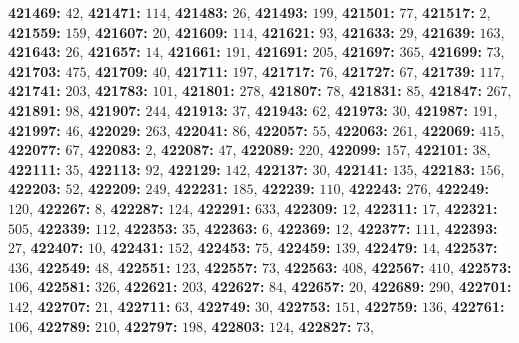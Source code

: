 \textsf{\bfseries 421469:} $42$, \textsf{\bfseries 421471:} $114$, \textsf{\bfseries 421483:} $26$, \textsf{\bfseries 421493:} $199$, \textsf{\bfseries 421501:} $77$, \textsf{\bfseries 421517:} $2$, \textsf{\bfseries 421559:} $159$, \textsf{\bfseries 421607:} $20$, \textsf{\bfseries 421609:} $114$, \textsf{\bfseries 421621:} $93$, \textsf{\bfseries 421633:} $29$, \textsf{\bfseries 421639:} $163$, \textsf{\bfseries 421643:} $26$, \textsf{\bfseries 421657:} $14$, \textsf{\bfseries 421661:} $191$, \textsf{\bfseries 421691:} $205$, \textsf{\bfseries 421697:} $365$, \textsf{\bfseries 421699:} $73$, \textsf{\bfseries 421703:} $475$, \textsf{\bfseries 421709:} $40$, \textsf{\bfseries 421711:} $197$, \textsf{\bfseries 421717:} $76$, \textsf{\bfseries 421727:} $67$, \textsf{\bfseries 421739:} $117$, \textsf{\bfseries 421741:} $203$, \textsf{\bfseries 421783:} $101$, \textsf{\bfseries 421801:} $278$, \textsf{\bfseries 421807:} $78$, \textsf{\bfseries 421831:} $85$, \textsf{\bfseries 421847:} $267$, \textsf{\bfseries 421891:} $98$, \textsf{\bfseries 421907:} $244$, \textsf{\bfseries 421913:} $37$, \textsf{\bfseries 421943:} $62$, \textsf{\bfseries 421973:} $30$, \textsf{\bfseries 421987:} $191$, \textsf{\bfseries 421997:} $46$, \textsf{\bfseries 422029:} $263$, \textsf{\bfseries 422041:} $86$, \textsf{\bfseries 422057:} $55$, \textsf{\bfseries 422063:} $261$, \textsf{\bfseries 422069:} $415$, \textsf{\bfseries 422077:} $67$, \textsf{\bfseries 422083:} $2$, \textsf{\bfseries 422087:} $47$, \textsf{\bfseries 422089:} $220$, \textsf{\bfseries 422099:} $157$, \textsf{\bfseries 422101:} $38$, \textsf{\bfseries 422111:} $35$, \textsf{\bfseries 422113:} $92$, \textsf{\bfseries 422129:} $142$, \textsf{\bfseries 422137:} $30$, \textsf{\bfseries 422141:} $135$, \textsf{\bfseries 422183:} $156$, \textsf{\bfseries 422203:} $52$, \textsf{\bfseries 422209:} $249$, \textsf{\bfseries 422231:} $185$, \textsf{\bfseries 422239:} $110$, \textsf{\bfseries 422243:} $276$, \textsf{\bfseries 422249:} $120$, \textsf{\bfseries 422267:} $8$, \textsf{\bfseries 422287:} $124$, \textsf{\bfseries 422291:} $633$, \textsf{\bfseries 422309:} $12$, \textsf{\bfseries 422311:} $17$, \textsf{\bfseries 422321:} $505$, \textsf{\bfseries 422339:} $112$, \textsf{\bfseries 422353:} $35$, \textsf{\bfseries 422363:} $6$, \textsf{\bfseries 422369:} $12$, \textsf{\bfseries 422377:} $111$, \textsf{\bfseries 422393:} $27$, \textsf{\bfseries 422407:} $10$, \textsf{\bfseries 422431:} $152$, \textsf{\bfseries 422453:} $75$, \textsf{\bfseries 422459:} $139$, \textsf{\bfseries 422479:} $14$, \textsf{\bfseries 422537:} $436$, \textsf{\bfseries 422549:} $48$, \textsf{\bfseries 422551:} $123$, \textsf{\bfseries 422557:} $73$, \textsf{\bfseries 422563:} $408$, \textsf{\bfseries 422567:} $410$, \textsf{\bfseries 422573:} $106$, \textsf{\bfseries 422581:} $326$, \textsf{\bfseries 422621:} $203$, \textsf{\bfseries 422627:} $84$, \textsf{\bfseries 422657:} $20$, \textsf{\bfseries 422689:} $290$, \textsf{\bfseries 422701:} $142$, \textsf{\bfseries 422707:} $21$, \textsf{\bfseries 422711:} $63$, \textsf{\bfseries 422749:} $30$, \textsf{\bfseries 422753:} $151$, \textsf{\bfseries 422759:} $136$, \textsf{\bfseries 422761:} $106$, \textsf{\bfseries 422789:} $210$, \textsf{\bfseries 422797:} $198$, \textsf{\bfseries 422803:} $124$, \textsf{\bfseries 422827:} $73$, 
